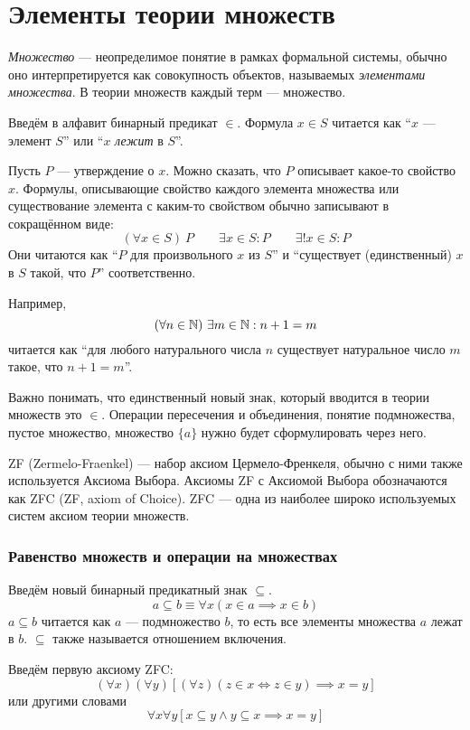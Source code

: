 \part{Элементы теории множеств}

{\it Множество} --- неопределимое понятие в рамках формальной системы,
обычно оно интерпретируется как совокупность объектов,
называемых {\it элементами множества}.
В теории множеств каждый терм --- множество.

Введём в алфавит бинарный предикат $\in$. Формула ${x\in S}$ читается
как ``$x$ --- элемент $S$'' или ``$x$ {\it лежит} в $S$''.

Пусть $P$ --- утверждение о $x$. Можно сказать, что $P$ описывает какое-то
свойство $x$.
Формулы, описывающие свойство каждого элемента множества или
существование элемента с каким-то свойством обычно записывают в сокращённом виде:
\[
	(\forall x\in S)~P\qquad \exists x\in S:P\qquad \exists!x\in S:P
\]
Они читаются как ``$P$ для произвольного $x$ из $S$'' и
``существует (единственный) $x$ в $S$ такой, что $P$'' соответственно.

Например,
\[
	(\forall n\in\mathbb N)~\exists m\in\mathbb N:n+1=m
\]
читается как ``для любого натурального числа $n$ существует натуральное число
$m$ такое, что $n+1=m$''.

Важно понимать, что единственный новый знак, который вводится в теории множеств
это $\in$. Операции пересечения и объединения, понятие подмножества, пустое множество,
множество $\{a\}$ нужно будет сформулировать через него.

ZF (Zermelo-Fraenkel) --- набор аксиом Цермело-Френкеля, обычно с ними также
используется Аксиома Выбора. Аксиомы ZF с Аксиомой Выбора
обозначаются как ZFC (ZF, axiom of Choice).
ZFC --- одна из наиболее широко используемых систем аксиом теории множеств.

\section{Равенство множеств и операции на множествах}

Введём новый бинарный предикатный знак $\subseteq$.
\[
	a\subseteq b\equiv \forall x(x\in a\implies x\in b)
\]
${a\subseteq b}$ читается как $a$ --- подмножество $b$, то есть все
элементы множества $a$ лежат в $b$. $\subseteq$ также называется
отношением включения.

Введём первую аксиому ZFC:
\[
	(\forall x)(\forall y)[(\forall z)(z\in x\iff z\in y)\implies x=y]
\]
или другими словами
\[
	\forall x\forall y[x\subseteq y\land y\subseteq x\implies x=y]
\]

